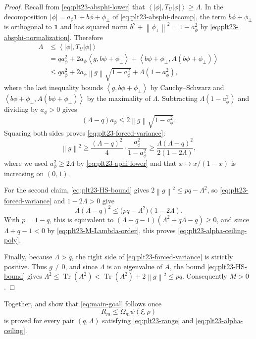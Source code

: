 ﻿\documentclass[11pt]{article}
\numberwithin{equation}{section}
\newcommand{\one}{\mathbf 1}
\newcommand{\ip}[2]{\left\langle #1,#2\right\rangle}
\newcommand{\norm}[1]{\left\lVert #1\right\rVert}
\newcommand{\Tr}{\operatorname{Tr}}
\begin{document}
\begin{proof}
  Recall from \eqref{eq:plt23-absphi-lower} that $\ip{|\phi|}{T_U|\phi|}\ge\Lambda$.
  In the decomposition $|\phi| = a_\phi \one + b \phi + \phi_\perp$ of \eqref{eq:plt23-absphi-decomp}, the term $b\phi+\phi_\perp$ is orthogonal to $\one$ and has squared norm $b^2+\norm{\phi_\perp}^2=1-a_\phi^2$ by \eqref{eq:plt23-absphi-normalization}.
  Therefore
  \begin{align*}
    \Lambda
    &\le\ip{|\phi|}{T_U|\phi|}\\
    &=qa_\phi^2+2a_\phi\ip g{b\phi+\phi_\perp}
    +\ip{b\phi+\phi_\perp}{A(b\phi+\phi_\perp)}\\
    &\le qa_\phi^2+2a_\phi\norm g\sqrt{1-a_\phi^2}
    +\Lambda(1-a_\phi^2),
  \end{align*}
  where the last inequality bounds $\ip g{b\phi+\phi_\perp}$ by Cauchy--Schwarz and $\ip{b\phi+\phi_\perp}{A(b\phi+\phi_\perp)}$ by the maximality of $\Lambda$.
  Subtracting $\Lambda(1-a_\phi^2)$ and dividing by $a_\phi>0$ gives
  \[
    (\Lambda-q)a_\phi
    \le2\norm g\sqrt{1-a_\phi^2}.
  \]
  Squaring both sides proves \eqref{eq:plt23-forced-variance}:
  \[
    \norm g^2\ge\frac{(\Lambda-q)^2}{4}\cdot\frac{a_\phi^2}{1-a_\phi^2} \ge \frac{\Lambda(\Lambda-q)^2}{2(1 - 2\Lambda)},
  \]
  where we used $a_\phi^2 \ge 2\Lambda$ by \eqref{eq:plt23-aphi-lower} and that $x \mapsto x/(1-x)$ is increasing on $(0,1)$.

  For the second claim, \eqref{eq:plt23-HS-bound} gives $2\norm g^2\le pq-\Lambda^2$, so \eqref{eq:plt23-forced-variance} and $1-2\Lambda>0$ give
  \[
    \Lambda(\Lambda-q)^2\le\bigl(pq-\Lambda^2\bigr)(1-2\Lambda).
  \]
  With $p=1-q$, this is equivalent to $(\Lambda+q-1)(\Lambda^2+q\Lambda-q)\ge0$, and since $\Lambda+q-1<0$ by \eqref{eq:plt23-M-Lambda-order}, this proves \eqref{eq:plt23-alpha-ceiling-poly}.

  Finally, because $\Lambda>q$, the right side of \eqref{eq:plt23-forced-variance} is strictly positive.
  Thus $g\ne0$, and since $\Lambda$ is an eigenvalue of $A$, the bound \eqref{eq:plt23-HS-bound} gives $\Lambda^2\le \Tr(A^2) < \Tr(A^2) + 2\norm{g}^2 \le pq$.
  Consequently $M>0$.
\end{proof}

Together,  and  show that \eqref{eq:main-goal} follows once
\begin{equation}\label{eq:plt23-scalar-target}
  R_m\le \Omega_m\psi(\xi,\rho)
\end{equation}
is proved for every pair $(q,\Lambda)$ satisfying \eqref{eq:plt23-range} and \eqref{eq:plt23-alpha-ceiling}.
\end{document}
